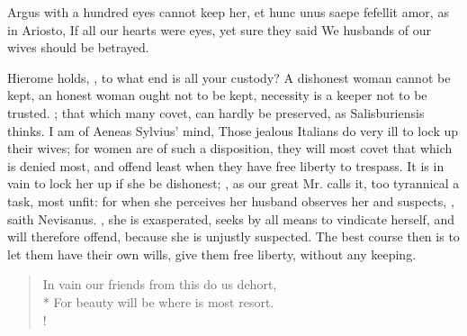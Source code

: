 Argus with a hundred eyes cannot keep her, et hunc unus saepe fefellit
amor, as in Ariosto,
If all our hearts were eyes, yet sure they said
We husbands of our wives should be betrayed.

Hierome holds, , to what end is all your
custody? A dishonest woman cannot be kept, an honest woman ought not to
be kept, necessity is a keeper not to be trusted. ; that which many covet, can hardly be preserved, as
 Salisburiensis thinks. I am of Aeneas Sylvius' mind, Those
jealous Italians do very ill to lock up their wives; for women are of
such a disposition, they will most covet that which is denied most, and
offend least when they have free liberty to trespass. It is in vain to lock her
up if she be dishonest; , as our great Mr.
\Aristotle calls it, too tyrannical a task, most unfit: for when she perceives
her husband observes her and suspects, , saith
Nevisanus. , she is exasperated, seeks by all means to vindicate
herself, and will therefore offend, because she is unjustly suspected. The best
course then is to let them have their own wills, give them free liberty,
without any keeping.
%
\begin{verse}%
In vain our friends from this do us dehort,\\*
For beauty will be where is most resort.\\!
\end{verse}%

